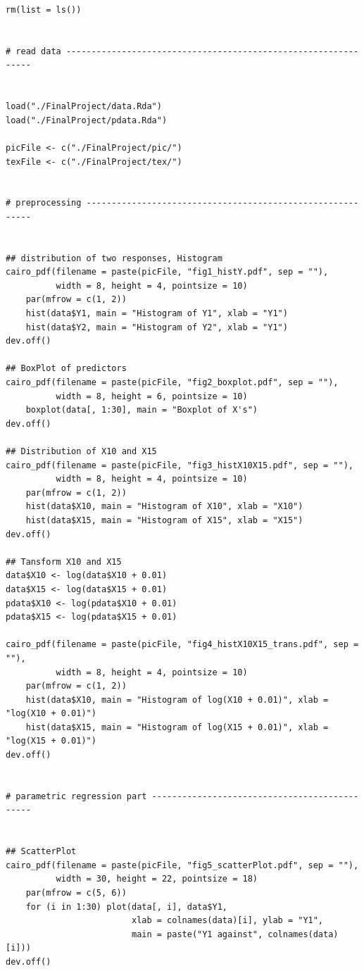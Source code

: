 \documentclass[11pt,oneside,a4paper]{article}
\begin{document}
\clearpage
\begin{verbatim}
rm(list = ls())


# read data ---------------------------------------------------------------


load("./FinalProject/data.Rda")
load("./FinalProject/pdata.Rda")

picFile <- c("./FinalProject/pic/")
texFile <- c("./FinalProject/tex/")


# preprocessing -----------------------------------------------------------


## distribution of two responses, Histogram
cairo_pdf(filename = paste(picFile, "fig1_histY.pdf", sep = ""), 
          width = 8, height = 4, pointsize = 10)
    par(mfrow = c(1, 2))
    hist(data$Y1, main = "Histogram of Y1", xlab = "Y1")
    hist(data$Y2, main = "Histogram of Y2", xlab = "Y1")
dev.off()

## BoxPlot of predictors
cairo_pdf(filename = paste(picFile, "fig2_boxplot.pdf", sep = ""), 
          width = 8, height = 6, pointsize = 10)
    boxplot(data[, 1:30], main = "Boxplot of X's")
dev.off()

## Distribution of X10 and X15
cairo_pdf(filename = paste(picFile, "fig3_histX10X15.pdf", sep = ""), 
          width = 8, height = 4, pointsize = 10)
    par(mfrow = c(1, 2))
    hist(data$X10, main = "Histogram of X10", xlab = "X10")
    hist(data$X15, main = "Histogram of X15", xlab = "X15")
dev.off()

## Tansform X10 and X15
data$X10 <- log(data$X10 + 0.01)
data$X15 <- log(data$X15 + 0.01)
pdata$X10 <- log(pdata$X10 + 0.01)
pdata$X15 <- log(pdata$X15 + 0.01)

cairo_pdf(filename = paste(picFile, "fig4_histX10X15_trans.pdf", sep = ""), 
          width = 8, height = 4, pointsize = 10)
    par(mfrow = c(1, 2))
    hist(data$X10, main = "Histogram of log(X10 + 0.01)", xlab = "log(X10 + 0.01)")
    hist(data$X15, main = "Histogram of log(X15 + 0.01)", xlab = "log(X15 + 0.01)")
dev.off()


# parametric regression part ----------------------------------------------


## ScatterPlot
cairo_pdf(filename = paste(picFile, "fig5_scatterPlot.pdf", sep = ""), 
          width = 30, height = 22, pointsize = 18)
    par(mfrow = c(5, 6))
    for (i in 1:30) plot(data[, i], data$Y1, 
                         xlab = colnames(data)[i], ylab = "Y1", 
                         main = paste("Y1 against", colnames(data)[i]))
dev.off()


\end{verbatim}
\end{document}
